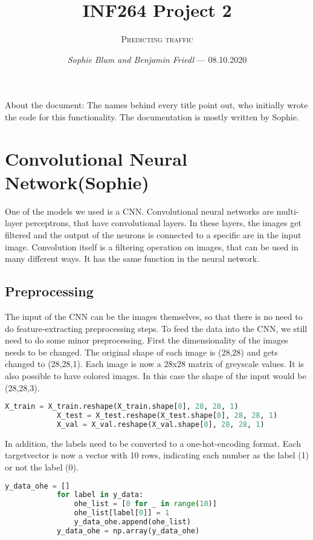 \documentclass[12pt,a4paper]{scrartcl}		%
\newcommand\svthema{INF264 Project 2}
\newcommand\svperson{Sophie Blum and Benjamin Friedl}
\newcommand\svdatum{08.10.2020}
\newcommand\lvname{Predicting traffic}
\begin{document}
\title{ \svthema}
\author{\textsc{\lvname}}
\date{ \small \textsl{\svperson} --- \svdatum }
\maketitle

\abstract
About the document:
The names behind every title point out, who initially wrote the code for this functionality.
The documentation is mostly written by Sophie. 

\section{Convolutional Neural Network(Sophie)}
    One of the models we used is a CNN. Convolutional neural networks are multi-layer perceptrons, that have convolutional layers. 
    In these layers, the images get filtered and the output of the neurons is connected to a specific are in the input image.
    Convolution itself is a filtering operation on images, that can be used in many different ways. It has the same function in the neural network.

    \subsection{Preprocessing}
        The input of the CNN can be the images themselves, so that there is no need to do feature-extracting preprocessing steps.
        To feed the data into the CNN, we still need to do some minor preprocessing.
        First the dimensionality of the images needs to be changed. The original shape of each image is (28,28) and gets changed to (28,28,1).
        Each image is now a 28x28 matrix of greyscale values. It is also possible to have colored images. In this case the shape of the input 
        would be (28,28,3).
        \begin{lstlisting}[language=Python]
            X_train = X_train.reshape(X_train.shape[0], 28, 28, 1)
            X_test = X_test.reshape(X_test.shape[0], 28, 28, 1)
            X_val = X_val.reshape(X_val.shape[0], 28, 28, 1)
        \end{lstlisting}
        In addition, the labels need to be converted to a one-hot-encoding format. Each targetvector is now a vector with 10 rows, indicating 
        each number as the label (1) or not the label (0).
        \begin{lstlisting}[language=Python]
            y_data_ohe = []
            for label in y_data:
                ohe_list = [0 for _ in range(10)]
                ohe_list[label[0]] = 1
                y_data_ohe.append(ohe_list)
            y_data_ohe = np.array(y_data_ohe)
        \end{lstlisting}
\end{document}
